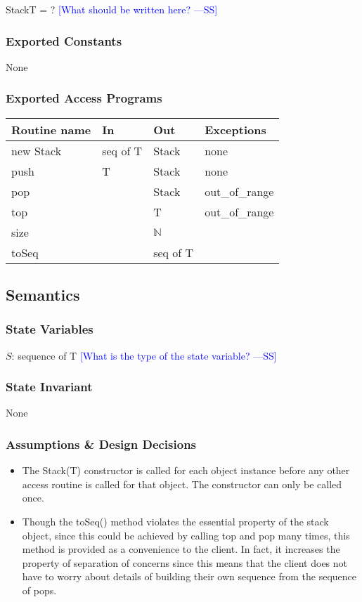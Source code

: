 \documentclass[12pt]{article}
\newcommand{\authornote}[3]{\textcolor{#1}{[#3 ---#2]}}
\newcommand{\authornote}[3]{}
\newcommand{\wss}[1]{\authornote{blue}{SS}{#1}}
\begin{document}
StackT = ?
\wss{What should be written here?}

\subsubsection* {Exported Constants}

None

\subsubsection* {Exported Access Programs}

\begin{tabular}{| l | l | l | p{5cm} |}
\hline
\textbf{Routine name} & \textbf{In} & \textbf{Out} & \textbf{Exceptions}\\
\hline
new Stack & seq of T & Stack & none\\
\hline
push & T & Stack & none\\
\hline
pop & & Stack & out\_of\_range\\
\hline
top & & T & out\_of\_range\\
\hline
size & & $\mathbb{N}$ & \\
\hline
toSeq& & seq of T & \\
\hline
\end{tabular}

\subsection* {Semantics}

\subsubsection* {State Variables}

$S$: sequence of T \wss{What is the type of the state variable?}

\subsubsection* {State Invariant}

None

\subsubsection* {Assumptions \& Design Decisions}

\begin{itemize}
\item The Stack(T) constructor is called for each object instance before any
  other access routine is called for that object.  The constructor can only be
  called once.
\item Though the toSeq() method violates the essential property of the stack
  object, since this could be achieved by calling top and pop many times, this
  method is provided as a convenience to the client. In fact, it increases the
  property of separation of concerns since this means that the client does not
  have to worry about details of building their own sequence from the sequence
  of pops.
\end{itemize}
\end{document}

